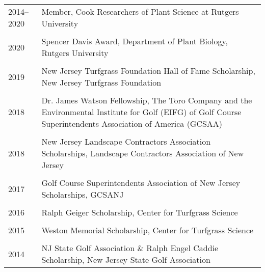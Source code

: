 \documentclass[letterpaper,11pt, english]{article}
\begin{document}
\begin{flushleft}
  \begin{tabularx}{\textwidth}{@{}lX@{}}
    2014--2020 \hspace{1cm} & Member, Cook Researchers of Plant Science at Rutgers University \\
      \\[-0.2cm] 
      2020 \hspace{1cm} & Spencer Davis Award, Department of Plant Biology, Rutgers University \\
      \\[-0.2cm] 
      2019 \hspace{1cm} & New Jersey Turfgrass Foundation Hall of Fame Scholarship, New Jersey Turfgrass Foundation \\
      \\[-0.2cm] 
      2018 \hspace{1cm} & Dr. James Watson Fellowship, The Toro Company and the Environmental Institute for Golf (EIFG) of Golf Course Superintendents Association of America (GCSAA) \\
      \\[-0.2cm] 
      2018 \hspace{1cm} & New Jersey Landscape Contractors Association Scholarships, Landscape Contractors Association of New Jersey \\
      \\[-0.2cm] 
      2017 \hspace{1cm} & Golf Course Superintendents Association of New Jersey Scholarships, GCSANJ \\
      \\[-0.2cm] 
      2016 \hspace{1cm} & Ralph Geiger Scholarship, Center for Turfgrass Science \\
      \\[-0.2cm] 
      2015 \hspace{1cm} & Weston Memorial Scholarship, Center for Turfgrass Science \\
      \\[-0.2cm] 
      2014 \hspace{1cm} & NJ State Golf Association \& Ralph Engel Caddie Scholarship, New Jersey State Golf Association \\
  \end{tabularx}
\end{flushleft}
  


\end{document}
